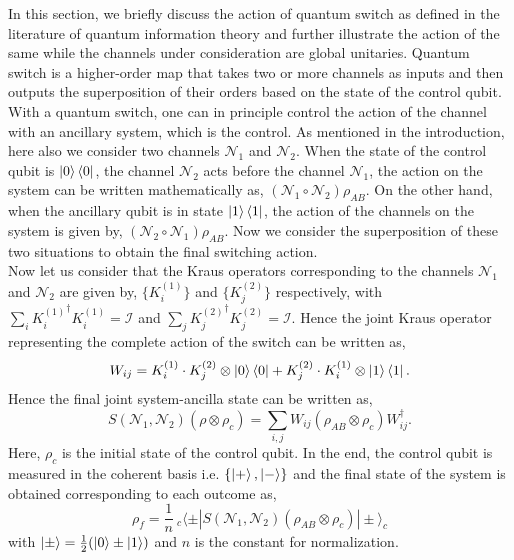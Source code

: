 In this section, we briefly discuss the action of quantum switch as defined in the literature of quantum information theory and further illustrate the action of the same while the channels under consideration are global unitaries. Quantum switch is a higher-order map that takes two or more channels as inputs and then outputs the superposition of their orders based on the state of the control qubit. With a quantum switch, one can in principle control the action of the channel with an ancillary system, which is the control. As mentioned in the introduction, here also we consider two channels $\mathcal{N}_1$ and $\mathcal{N}_2$. When the state of the control qubit is $\ket{0}\bra{0}$, the channel $\mathcal{N}_2$ acts before the channel $\mathcal{N}_1$, the action on the system can be written mathematically as, $(\mathcal{N}_1 \circ \mathcal{N}_2) \rho_{AB}$. On the other hand, when the ancillary qubit is in state $\ket{1}\bra{1}$, the action of the channels on the system is given by, $(\mathcal{N}_2 \circ \mathcal{N}_1) \rho_{AB}$. Now we consider the superposition of these two situations to obtain the final switching action. \\

Now let us consider that the Kraus operators corresponding to the channels  $\mathcal{N}_1$ and $\mathcal{N}_2$ are given by, $\{K_{i}^{(1)}\}$ and $\{K_{j}^{(2)}\}$ respectively, with $\sum_i {K^{(1)}_i}^{\dagger} K^{(1)}_i = \mathcal{I}$ and $\sum_j {K^{(2)}_j}^{\dagger} K^{(2)}_j = \mathcal{I}$. Hence the joint Kraus operator representing the complete action of the switch can be written as, 
 \begin{equation}
    W_{ij} = K_{i}^{(1)} \cdot K_{j}^{(2)} \otimes \ket{0}\bra{0} + K_{j}^{(2)} \cdot K_{i}^{(1)} \otimes \ket{1}\bra{1}.
    \label{switch_Kraus}
\end{equation}
Hence the final joint system-ancilla state can be written as, 
\begin{equation}
    S(\mathcal{N}_1,\mathcal{N}_2)(\rho \otimes \rho_c) = \sum_{i,j} W_{ij}(\rho_{AB} \otimes \rho_c)W_{ij}^{\dagger}.
    \label{switchaction}
\end{equation}
Here, $\rho_c$ is the initial state of the control qubit. In the end, the control qubit is measured in the coherent basis i.e. $\{\ket{+},\ket{-}\}$ and the final state of the system is obtained corresponding to each outcome as, 
\begin{equation}
    \rho_f = \frac{1}{n}~ _c\langle\pm|S(\mathcal{N}_1,\mathcal{N}_2)(\rho_{AB} \otimes \rho_c)|\pm\rangle_c
    \label{FS}
\end{equation}
with $\ket{\pm}=\frac{1}{2}(\ket{0}\pm\ket{1})$ and $n$ is the constant for normalization. \\
\iffalse
 \begin{figure}[htp]
    \fbox{\texttt{[image: switch\_handdrawn\_pic.pdf]}}
    \caption{\footnotesize{Action of switch.}}
    \label{LHS_eval_cond_modW}
    \end{figure}
\fi

